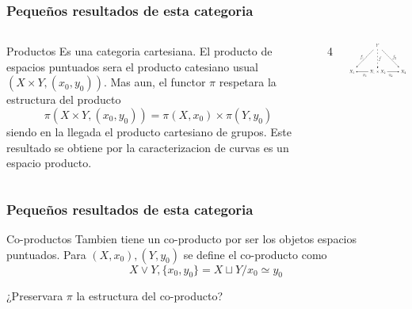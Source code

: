 \documentclass[xetex,mathserif,serif]{beamer}
\begin{document}
  \begin{frame}
    \frametitle{Pequeños resultados de esta categoria}
    \begin{columns}
      \begin{column}{0.6\textwidth}
        \begin{block}{Productos}
          Es una categoria cartesiana. El producto de espacios puntuados
          sera el producto catesiano usual \((X \times Y, (x_0, y_0))\).
          Mas aun, el functor \(\pi\) respetara la estructura del
          producto
          \[ \pi (X \times Y , (x_0, y_0)) = \pi (X, x_0) \times \pi (Y,
            y_0)\]
          siendo en la llegada el producto cartesiano de
          grupos. Este resultado se obtiene por la caracterizacion de
          curvas es un espacio producto.
        \end{block}
      \end{column}
4     \begin{column}{.4\textwidth}
        \begin{center}
          \includegraphics[scale=0.5]{./imag/CategoricalProduct-03.png}
        \end{center}
      \end{column}
    \end{columns}
  \end{frame}
  \begin{frame}
    \frametitle{Pequeños resultados de esta categoria}
    \begin{block}{Co-productos}
      Tambien tiene un co-producto por ser los objetos espacios
      puntuados. Para \((X, x_0) , (Y, y_0)\) se define el co-producto
      como
      \[ X \vee Y , \{x_0, y_0\} = X \sqcup Y / x_0 \simeq y_0 \]
    \end{block}
    \begin{block}{}
      ¿Preservara \(\pi\) la estructura del co-producto?
    \end{block}
  \end{frame}
\end{document}
